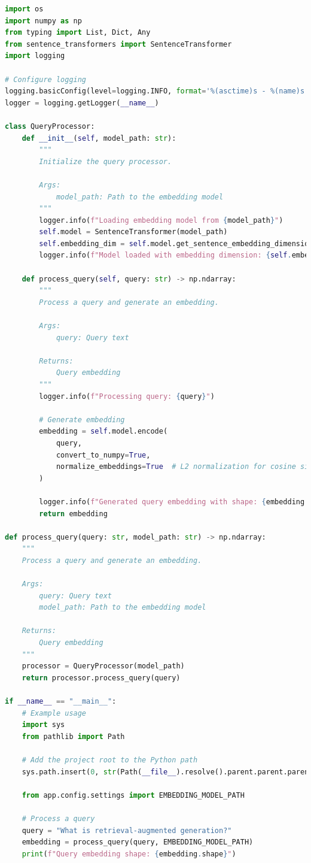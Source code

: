 \documentclass[
  screen,review,acmlarge]{acmart}
\begin{document}
\begin{lstlisting}[language=Python]
import os
import numpy as np
from typing import List, Dict, Any
from sentence_transformers import SentenceTransformer
import logging

# Configure logging
logging.basicConfig(level=logging.INFO, format='%(asctime)s - %(name)s - %(levelname)s - %(message)s')
logger = logging.getLogger(__name__)

class QueryProcessor:
    def __init__(self, model_path: str):
        """
        Initialize the query processor.
        
        Args:
            model_path: Path to the embedding model
        """
        logger.info(f"Loading embedding model from {model_path}")
        self.model = SentenceTransformer(model_path)
        self.embedding_dim = self.model.get_sentence_embedding_dimension()
        logger.info(f"Model loaded with embedding dimension: {self.embedding_dim}")
    
    def process_query(self, query: str) -> np.ndarray:
        """
        Process a query and generate an embedding.
        
        Args:
            query: Query text
            
        Returns:
            Query embedding
        """
        logger.info(f"Processing query: {query}")
        
        # Generate embedding
        embedding = self.model.encode(
            query,
            convert_to_numpy=True,
            normalize_embeddings=True  # L2 normalization for cosine similarity
        )
        
        logger.info(f"Generated query embedding with shape: {embedding.shape}")
        return embedding

def process_query(query: str, model_path: str) -> np.ndarray:
    """
    Process a query and generate an embedding.
    
    Args:
        query: Query text
        model_path: Path to the embedding model
        
    Returns:
        Query embedding
    """
    processor = QueryProcessor(model_path)
    return processor.process_query(query)

if __name__ == "__main__":
    # Example usage
    import sys
    from pathlib import Path
    
    # Add the project root to the Python path
    sys.path.insert(0, str(Path(__file__).resolve().parent.parent.parent))
    
    from app.config.settings import EMBEDDING_MODEL_PATH
    
    # Process a query
    query = "What is retrieval-augmented generation?"
    embedding = process_query(query, EMBEDDING_MODEL_PATH)
    print(f"Query embedding shape: {embedding.shape}")
\end{lstlisting}
\end{document}
